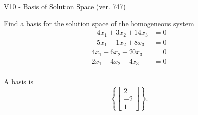 \begin{exercise}
  \begin{exerciseTitle}V10 - Basis of Solution Space (ver. 747)\end{exerciseTitle}
  \begin{exerciseStatement}
    Find a basis for the solution space of the homogeneous system 
\begin{align*}
 -4 x_ 1 + 3 x_ 2 + 14 x_ 3 &= 0  \\ 
  -5 x_ 1 -1 x_ 2 + 8 x_ 3 &= 0  \\ 
  4 x_ 1 -6 x_ 2 -20 x_ 3 &= 0  \\ 
  2 x_ 1 + 4 x_ 2 + 4 x_ 3 &= 0  \\ 
 \end{align*}


 
  \end{exerciseStatement}

  \begin{exerciseAnswer}
   A basis is   
\[\left\{\left[\begin{array}{c}
2 \\
-2 \\
1
\end{array}\right]\right\}.\]

  


  \end{exerciseAnswer}
\end{exercise}